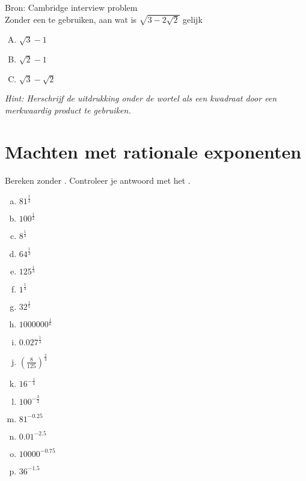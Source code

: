 \documentclass[12pt,twoside]{article}
\begin{document}
\begin{oefening}{\scriptsize Bron: Cambridge interview problem}\\
  Zonder een  te gebruiken, aan wat is  $\displaystyle\sqrt{3 - 2\sqrt{2}}$  gelijk
  \begin{enumerate}[(A)]
  \item $\sqrt{3}-1$
  \item $\sqrt{2}-1$
  \item $\sqrt{3}-\sqrt{2}$
  \end{enumerate}
  {\em Hint: Herschrijf de uitdrukking onder de wortel als een kwadraat door een merkwaardig product te gebruiken.}
\end{oefening}

\pagebreak
\section{Machten met rationale exponenten}

\begin{oefening}
Bereken zonder . Controleer je antwoord met het .
\begin{multicols}{3}
\begin{enumerate}[(a)]
  \itemsep.5em
  \item ${81}^{\frac{1}{2}}$
  \item ${100}^{\frac{1}{2}}$
  \item ${8}^{\frac{1}{3}}$
  \item ${64}^{\frac{1}{3}}$
  \item ${125}^{\frac{1}{3}}$
  \item ${1}^{\frac{1}{4}}$
  \item ${32}^{\frac{1}{5}}$
  \item ${1000000}^{\frac{1}{6}}$
  \item ${0.027}^{\frac{1}{3}}$
  \item $\left(\frac{8}{125}\right)^{\frac{2}{3}}$
  \item ${16}^{-\frac{1}{4}}$
  \item ${100}^{-\frac{3}{2}}$
  \item ${81}^{-0.25}$
  \item ${0.01}^{-2.5}$
  \item ${10000}^{-0.75}$
  \item ${36}^{-1.5}$
\end{enumerate}
\end{multicols}
\end{oefening}
\end{document}
